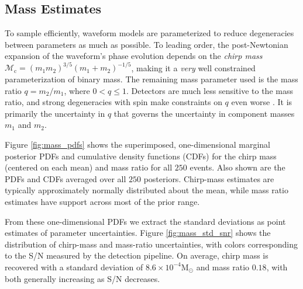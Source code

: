 \subsection{Mass Estimates}\label{sec:mass}
To sample efficiently, waveform models are parameterized to reduce degeneracies between parameters as much as possible.  To leading order, the post-Newtonian expansion of the waveform's phase evolution depends on the \emph{chirp mass} $\mathcal{M}_\mathrm{c} = (m_1 m_2)^{3/5} (m_1 + m_2)^{-1/5}$, making it a \emph{very} well constrained parameterization of binary mass.  The remaining mass parameter used is the mass ratio $q = m_2/m_1$, where $0 < q \leq 1$.  Detectors are much less sensitive to the mass ratio, and strong degeneracies with spin make constraints on $q$ even worse \citep{Cutler_1994}.  It is primarily the uncertainty in $q$ that governs the uncertainty in component masses $m_1$ and $m_2$.

Figure \ref{fig:mass_pdfs} shows the superimposed, one-dimensional marginal posterior PDFs and cumulative density functions (CDFs) for the chirp mass (centered on each mean) and mass ratio for all $250$ events.  Also shown are the PDFs and CDFs averaged over all $250$ posteriors. Chirp-mass estimates are typically approximately normally distributed about the mean, while mass ratio estimates have support across most of the prior range.

From these one-dimensional PDFs we extract the standard deviations as point estimates of parameter uncertainties.  Figure \ref{fig:mass_std_snr} shows the distribution of chirp-mass and mass-ratio uncertainties, with colors corresponding to the S/N measured by the detection pipeline. On average, chirp mass is recovered with a standard deviation of $8.6 \times 10^{-4} \mathrm{M}_\odot$ and mass ratio $0.18$, with both generally increasing as S/N decreases.
  
  
  